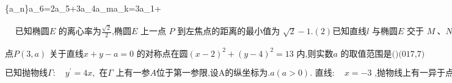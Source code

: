 \{a_n\}a_6=2a_5+3a_4a_m\mathrm{,}a_k=3a_1+

$\begin{aligned}&\text{已知椭圆}E\text{ 的离心率为}\frac{\sqrt{2}}{2}\text{,椭圆}E\text{ 上一点 }P\text{ 到左焦点的距离的最小值为 }\sqrt{2}-1.(2)\text{已知直线}l\text{ 与椭圆}E\text{ 交于 }M\mathrm{~、}N\text{ 两点,且}OM\perp ON\text{,求心OMN面积的取值范围(017,9)}.\end{aligned}$

$\text{点}P(3,a)\text{ 关于直线}x+y-a=0\text{ 的对称点在圆}(x-2)^2+(y-4)^2=13\text{ 内,则实数}a\text{ 的取值范围是()(017,7)}$

$\text{已知抛物线}\Gamma:\quad y^{\prime}=4x,\text{ 在}\Gamma\text{ 上有一参}A\text{位于第一参限,设A的纵坐标为}.a(a>0).\text{ 直线}:\quad x=-3\text{ ,抛物线上有一异于点A的动点P,P在直线}\text{上的投影为点H,直线AP与直线的交点为}Q.\text{ 若在P的位置变化过程中,}\left|HQ\right|>4\text{ 恒成立,求a的取值范围(022,18)}.$